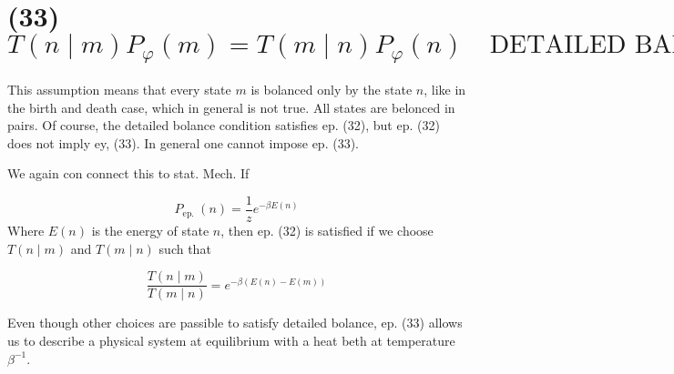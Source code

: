 \section*{(33) $T(n \mid m) P_{\varphi}(m)=T(m \mid n) P_{\varphi}(n) \quad \text{DETAILED BALANCE}$}
This assumption means that every state $m$ is bolanced only by the state $n$, like in the birth
and death case, which in general is not true. All states are belonced in pairs. Of course, the detailed bolance condition satisfies ep. (32), but ep. (32) does not imply ey, (33). In general one cannot impose ep. (33).

We again con connect this to stat. Mech. If

$$ P_{\text {ep. }}(n)=\frac{1}{z} e^{-\beta E(n)}
$$ 
Where $E(n)$ is the energy of state $n$, then ep. (32) is satisfied if we choose $T(n \mid m)$ and $T(m \mid n)$ such that


\begin{equation*}
\frac{T(n \mid m)}{T(m \mid n)}=e^{-\beta(E(n)-E(m))} \tag{33}
\end{equation*}

Even though other choices are passible to satisfy detailed bolance, ep. (33) allows us to describe a physical system at equilibrium with a heat beth at temperature $\beta^{-1}$.
